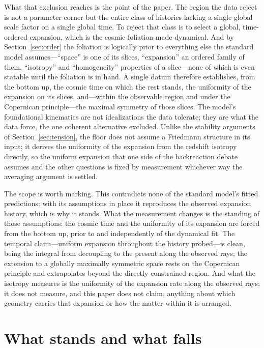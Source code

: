 \documentclass[twocolumn]{aastex701}
\begin{document}
What that exclusion reaches is the point of the paper. The region the data reject is not a parameter corner but the entire class of histories lacking a single global scale factor on a single global time. To reject that class is to select a global, time-ordered expansion, which is the cosmic foliation made dynamical. And by Section~\ref{sec:order} the foliation is logically prior to everything else the standard model assumes---``space'' is one of its slices, ``expansion'' an ordered family of them, ``isotropy'' and ``homogeneity'' properties of a slice---none of which is even statable until the foliation is in hand. A single datum therefore establishes, from the bottom up, the cosmic time on which the rest stands, the uniformity of the expansion on its slices, and---within the observable region and under the Copernican principle---the maximal symmetry of those slices. The model's foundational kinematics are not idealizations the data tolerate; they are what the data force, the one coherent alternative excluded. Unlike the stability arguments of Section~\ref{sec:tension}, the floor does not assume a Friedmann structure in its input; it derives the uniformity of the expansion from the redshift isotropy directly, so the uniform expansion that one side of the backreaction debate assumes and the other questions is fixed by measurement whichever way the averaging argument is settled.

The scope is worth marking. This contradicts none of the standard model's fitted predictions; with its assumptions in place it reproduces the observed expansion history, which is why it stands. What the measurement changes is the standing of those assumptions: the cosmic time and the uniformity of its expansion are forced from the bottom up, prior to and independently of the dynamical fit. The temporal claim---uniform expansion throughout the history probed---is clean, being the integral from decoupling to the present along the observed rays; the extension to a globally maximally symmetric space rests on the Copernican principle and extrapolates beyond the directly constrained region. And what the isotropy measures is the uniformity of the expansion rate along the observed rays; it does not measure, and this paper does not claim, anything about which geometry carries that expansion or how the matter within it is arranged.

\section{What stands and what falls}\label{sec:stands}
\end{document}

